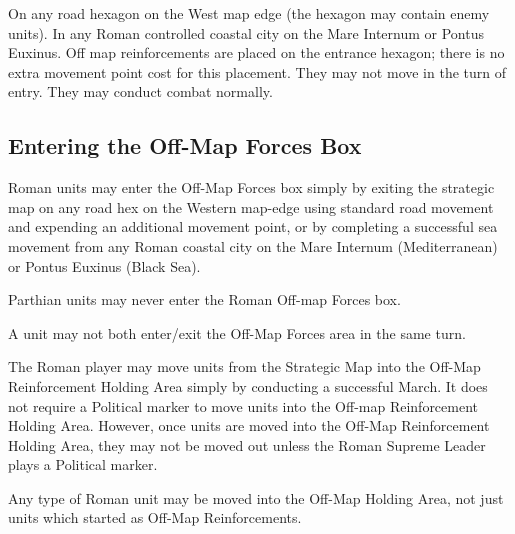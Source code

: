 On any road hexagon on the West map edge (the hexagon may contain enemy units).
In any Roman controlled coastal city on the Mare Internum or Pontus Euxinus.
Off map reinforcements are placed on the entrance hexagon; there is no extra movement point cost for this placement. They may not move in the turn of entry. They may conduct combat normally.

\subsection{Entering the Off-Map Forces Box}

Roman units may enter the Off-Map Forces box simply by exiting the strategic map on any road hex on the Western map-edge using standard road movement and expending an additional movement point, or by completing a successful sea movement from any Roman coastal city on the Mare Internum (Mediterranean) or Pontus Euxinus (Black Sea).

Parthian units may never enter the Roman Off-map Forces box.

A unit may not both enter/exit the Off-Map Forces area in the same turn.

The Roman player may move units from the Strategic Map into the Off-Map Reinforcement Holding Area simply by conducting a successful March. It does not require a Political marker to move units into the Off-map Reinforcement Holding Area. However, once units are moved into the Off-Map Reinforcement Holding Area, they may not be moved out unless the Roman Supreme Leader plays a Political marker.

Any type of Roman unit may be moved into the Off-Map Holding Area, not just units which started as Off-Map Reinforcements.